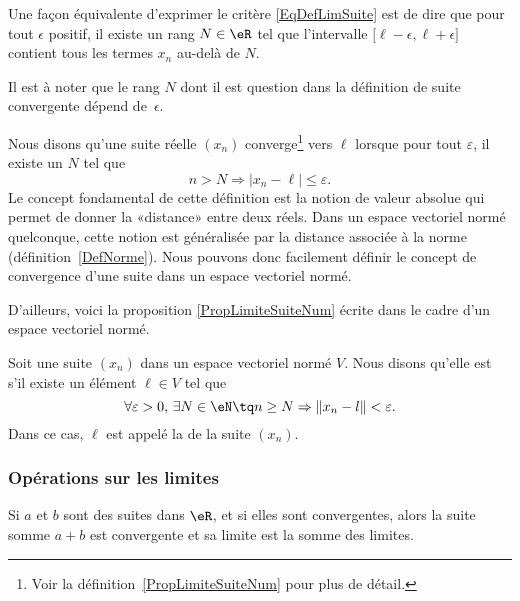 Une façon équivalente d'exprimer le critère \eqref{EqDefLimSuite} est de dire que pour tout $\epsilon$ positif, il existe un rang $N\in\eR$ tel que l'intervalle $\mathopen[ \ell-\epsilon , \ell+\epsilon \mathclose]$ contient tous les termes $x_n$ au-delà de $N$.

Il est à noter que le rang $N$ dont il est question dans la définition de suite convergente dépend de~$\epsilon$.

Nous disons qu'une suite réelle $(x_n)$ converge\footnote{Voir la définition~\ref{PropLimiteSuiteNum} pour plus de détail.} vers $\ell$ lorsque pour tout $\varepsilon$, il existe un $N$ tel que
\begin{equation}
	n>N\Rightarrow | x_n-\ell |\leq\varepsilon.
\end{equation}
Le concept fondamental de cette définition est la notion de valeur absolue qui permet de donner la «distance» entre deux réels. Dans un espace vectoriel normé quelconque, cette notion est généralisée par la distance associée à la norme (définition~\ref{DefNorme}). Nous pouvons donc facilement définir le concept de convergence d'une suite dans un espace vectoriel normé.

D'ailleurs, voici la proposition \ref{PropLimiteSuiteNum} écrite dans le cadre d'un espace vectoriel normé.

\begin{definition}		\label{DefCvSuiteEGVN}
	Soit une suite $(x_n)$ dans un espace vectoriel normé $V$. Nous disons qu'elle est
     s'il existe un élément $\ell\in V$ tel que
	\begin{equation}
		\forall \varepsilon>0,\,\exists N\in\eN\tq n\geq N\Rightarrow \| x_n-l \|<\varepsilon.
	\end{equation}
	Dans ce cas, $\ell$ est appelé la  de la suite $(x_n)$.
\end{definition}



\subsubsection{Opérations sur les limites}

\begin{lemma}       \label{LEMooSFBLooKSXiyj}
    Si \( a\) et \( b\) sont des suites dans \( \eR\), et si elles sont convergentes, alors la suite somme \( a+b\) est convergente et sa limite est la somme des limites.
\end{lemma}

